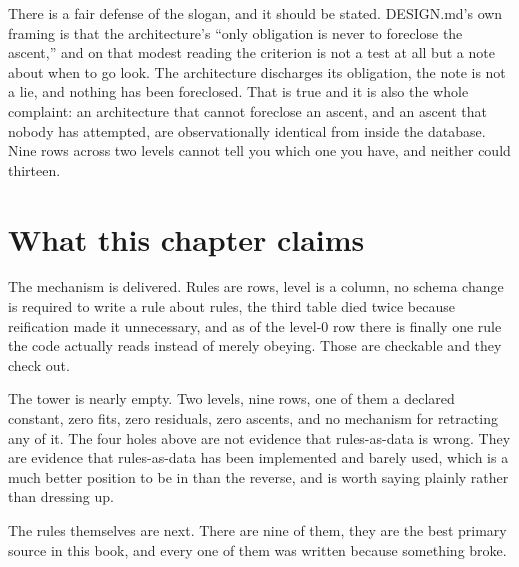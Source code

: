 There is a fair defense of the slogan, and it should be stated. DESIGN.md's own framing is that the architecture's ``only obligation is never to foreclose the ascent,'' and on that modest reading the criterion is not a test at all but a note about when to go look. The architecture discharges its obligation, the note is not a lie, and nothing has been foreclosed. That is true and it is also the whole complaint: an architecture that cannot foreclose an ascent, and an ascent that nobody has attempted, are observationally identical from inside the database. Nine rows across two levels cannot tell you which one you have, and neither could thirteen.

\section{What this chapter claims}

The mechanism is delivered. Rules are rows, level is a column, no schema change is required to write a rule about rules, the third table died twice because reification made it unnecessary, and as of the level-0 row there is finally one rule the code actually reads instead of merely obeying. Those are checkable and they check out.

The tower is nearly empty. Two levels, nine rows, one of them a declared constant, zero fits, zero residuals, zero ascents, and no mechanism for retracting any of it. The four holes above are not evidence that rules-as-data is wrong. They are evidence that rules-as-data has been implemented and barely used, which is a much better position to be in than the reverse, and is worth saying plainly rather than dressing up.

The rules themselves are next. There are nine of them, they are the best primary source in this book, and every one of them was written because something broke.
